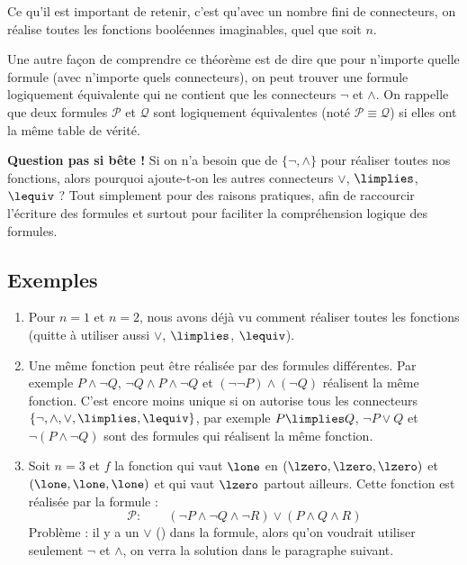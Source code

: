 \documentclass[11pt,class=report,crop=false]{standalone}
\begin{document}
Ce qu'il est important de retenir, c'est qu'avec un nombre fini de connecteurs, on réalise toutes les fonctions booléennes imaginables, quel que soit $n$.

Une autre façon de comprendre ce théorème est de dire que pour n'importe quelle formule (avec n'importe quels connecteurs), on peut trouver une formule logiquement équivalente qui ne contient que les connecteurs $\lnot$ et $\land$. On rappelle que deux formules $\mathcal{P}$ et $\mathcal{Q}$ sont logiquement équivalentes (noté $\mathcal{P} \equiv \mathcal{Q}$) si elles ont la même table de vérité.

\textbf{Question pas si bête !}
Si on n'a besoin que de $\{\lnot, \land\}$ pour réaliser toutes nos fonctions, alors pourquoi ajoute-t-on les autres connecteurs $\lor$, $\limplies$, $\lequiv$ ?
Tout simplement pour des raisons pratiques, afin de raccourcir l'écriture des formules et surtout pour faciliter la compréhension logique des formules.

\subsection{Exemples}

\begin{enumerate}
	\item Pour $n=1$ et $n=2$, nous avons déjà vu comment réaliser toutes les fonctions (quitte à utiliser aussi $\lor$, $\limplies$, $\lequiv$).
	
	\item Une même fonction peut être réalisée par des formules différentes.
	Par exemple $P \land \lnot Q$, $\lnot Q \land P \land \lnot Q$ et $(\lnot \lnot P) \land (\lnot Q)$ réalisent la même fonction.
	C'est encore moins unique si on autorise tous les connecteurs $\{\lnot, \land, \lor, \limplies, \lequiv\}$, par exemple $P \limplies Q$, $\lnot P \lor Q$ et $\lnot (P \land \lnot Q)$ sont des formules qui réalisent la même fonction.
	
	\item Soit $n=3$ et $f$ la fonction qui vaut $\lone$ en $(\lzero,\lzero,\lzero)$ et $(\lone,\lone,\lone)$ et qui vaut $\lzero$ partout ailleurs. Cette fonction est réalisée par la formule :
	\[
	\mathcal{P} : \qquad (\lnot P \land \lnot Q \land \lnot R) \lor (P \land Q \land R)
	\]
	Problème : il y a un $\lor$ (\tor) dans la formule, alors qu'on voudrait utiliser seulement $\lnot$ et $\land$, on verra la solution dans le paragraphe suivant.
\end{enumerate}
\end{document}
